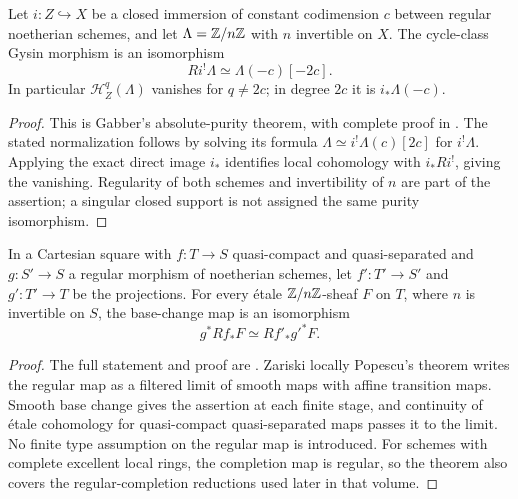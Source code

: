 \begin{theorem}\label{thm:B3-purity}
Let $i:Z\hookrightarrow X$ be a closed immersion of constant
codimension $c$ between regular noetherian schemes, and let
$\Lambda={\mathbb{Z}}/n{\mathbb{Z}}$ with $n$ invertible on $X$. The cycle-class Gysin
morphism is an isomorphism
\[
                 Ri^!\Lambda\simeq\Lambda(-c)[-2c].
\]
In particular $\mathcal H^q_Z(\Lambda)$ vanishes for $q\ne2c$;
in degree $2c$ it is $i_*\Lambda(-c)$.
\end{theorem}
\begin{proof}
This is Gabber's absolute-purity theorem, with complete proof in
\cite[Expos\'e XVI, Theorem 3.1.1, p.~242]{BILO2014}. The stated
normalization follows by solving its formula
$\Lambda\simeq i^!\Lambda(c)[2c]$ for $i^!\Lambda$.
Applying the exact direct image $i_*$ identifies local cohomology
with $i_*Ri^!$, giving the vanishing. Regularity of both schemes
and invertibility of $n$ are part of the assertion; a singular
closed support is not assigned the same purity isomorphism.
\end{proof}

\begin{theorem}\label{thm:B3-regular-bc}
In a Cartesian square with $f:T\to S$ quasi-compact and
quasi-separated and $g:S'\to S$ a regular morphism of noetherian
schemes, let $f':T'\to S'$ and $g':T'\to T$ be the projections.
For every \'etale ${\mathbb{Z}}/n{\mathbb{Z}}$-sheaf $F$ on $T$, where $n$ is invertible
on $S$, the base-change map is an isomorphism
\[
                    g^*Rf_*F\simeq Rf'_*g'^*F.
\]
\end{theorem}
\begin{proof}
The full statement and proof are
\cite[Expos\'e XIV, Lemma 2.5.3, pp.~216--217]{BILO2014}.
Zariski locally Popescu's theorem writes the regular map as a
filtered limit of smooth maps with affine transition maps.
Smooth base change gives the assertion at each finite stage,
and continuity of \'etale cohomology for quasi-compact
quasi-separated maps passes it to the limit. No finite type
assumption on the regular map is introduced. For schemes with
complete excellent local rings, the completion map is regular,
so the theorem also covers the regular-completion reductions
used later in that volume.
\end{proof}

